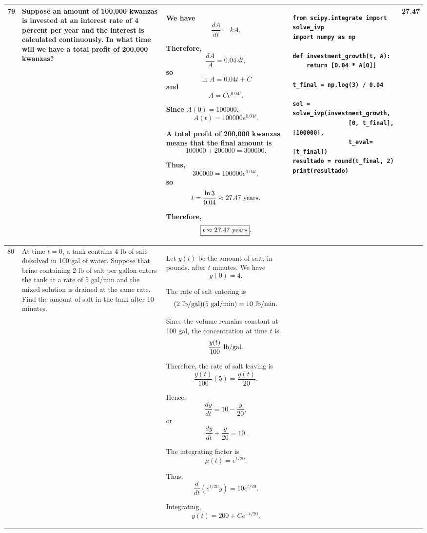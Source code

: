 \documentclass[a4paper,12pt]{article}
\begin{document}
\begin{longtable}{|p{0.3cm}|p{}|p{10cm}|p{}|p{1.5cm}|}
79 &
Suppose an amount of 100,000 kwanzas is invested at an interest rate of 4 percent per year and the interest is calculated continuously. In what time will we have a total profit of 200,000 kwanzas? &
We have
\[
\frac{dA}{dt}=kA.
\]

Therefore,
\[
\frac{dA}{A}=0.04\,dt,
\]
so
\[
\ln A=0.04t+C
\]
and
\[
A=Ce^{0.04t}.
\]

Since $A(0)=100000$,
\[
A(t)=100000e^{0.04t}.
\]

A total profit of 200,000 kwanzas means that the final amount is
\[
100000+200000=300000.
\]

Thus,
\[
300000=100000e^{0.04t},
\]
so
\[
t=\frac{\ln3}{0.04}
\approx27.47\ {\rm years}.
\]

Therefore,
\[
\boxed{t\approx27.47\ {\rm years}}.
\]
&
\begin{verbatim}
from scipy.integrate import solve_ivp
import numpy as np

def investment_growth(t, A):
    return [0.04 * A[0]]

t_final = np.log(3) / 0.04

sol = solve_ivp(investment_growth,
                [0, t_final], [100000],
                t_eval=[t_final])
resultado = round(t_final, 2)
print(resultado)
\end{verbatim}
&
27.47 \\
\hline

80 &
At time $t=0$, a tank contains 4 lb of salt dissolved in 100 gal of water. Suppose that brine containing 2 lb of salt per gallon enters the tank at a rate of 5 gal/min and the mixed solution is drained at the same rate. Find the amount of salt in the tank after 10 minutes. &
Let $y(t)$ be the amount of salt, in pounds, after $t$ minutes. We have
\[
y(0)=4.
\]

The rate of salt entering is
\[
(2\ {\rm lb/gal})(5\ {\rm gal/min})
=10\ {\rm lb/min}.
\]

Since the volume remains constant at 100 gal, the concentration at time $t$ is
\[
\frac{y(t)}{100}\ {\rm lb/gal}.
\]

Therefore, the rate of salt leaving is
\[
\frac{y(t)}{100}(5)
=\frac{y(t)}{20}.
\]

Hence,
\[
\frac{dy}{dt}=10-\frac{y}{20},
\]
or
\[
\frac{dy}{dt}+\frac{y}{20}=10.
\]

The integrating factor is
\[
\mu(t)=e^{t/20}.
\]

Thus,
\[
\frac{d}{dt}
\left(e^{t/20}y\right)
=10e^{t/20}.
\]

Integrating,
\[
y(t)=200+Ce^{-t/20}.
\]


\end{longtable}
\end{document}
